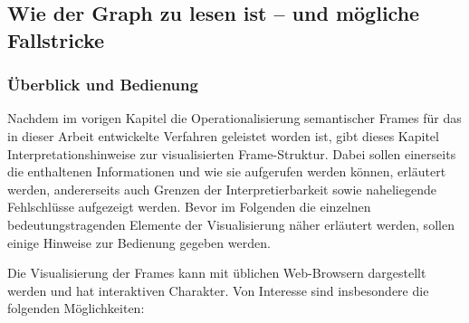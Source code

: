 \subsection{Wie der Graph zu lesen ist -- und mögliche Fallstricke}\label{wie-der-graph-zu-lesen-ist-und-moegliche-fallstricke}

\subsubsection{Überblick und Bedienung}\label{ueberblick-und-bedienung}

Nachdem im vorigen Kapitel die Operationalisierung semantischer Frames für das in dieser Arbeit entwickelte Verfahren geleistet worden ist, gibt dieses Kapitel Interpretationshinweise zur visualisierten Frame-Struktur. Dabei sollen einerseits die enthaltenen Informationen und wie sie aufgerufen werden können, erläutert werden, andererseits auch Grenzen der Interpretierbarkeit sowie naheliegende Fehlschlüsse aufgezeigt werden. Bevor im Folgenden die einzelnen bedeutungstragenden Elemente der Visualisierung näher erläutert werden, sollen einige Hinweise zur Bedienung gegeben werden.

Die Visualisierung der Frames kann mit üblichen Web-Browsern dargestellt werden und hat interaktiven Charakter. Von Interesse sind insbesondere die folgenden Möglichkeiten:

